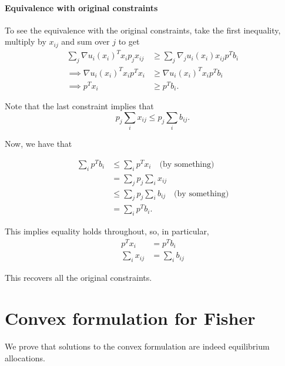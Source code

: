 \documentclass[12pt]{article}
\begin{document}
\paragraph{Equivalence with original constraints}
To see the equivalence with the original constraints, take the first inequality,
multiply by $x_{ij}$ and sum over $j$ to get
\begin{align*}
\sum_j \nabla u_i(x_i)^T x_i p_j x_{ij} &\geq \sum_j \nabla_j u_i(x_i) x_{ij} p^T b_i \\
\implies \nabla u_i(x_i)^T x_i p^T x_i &\geq \nabla u_i(x_i)^T x_i p^T b_i \\
\implies p^T x_i &\geq p^T b_i.
\end{align*}

Note that the last constraint implies that
\[
p_j \sum_i x_{ij} \leq p_j \sum_i b_{ij}.
\]

Now, we have that

\begin{align*}
\sum_i p^T b_i &\leq \sum_i p^T x_i\quad \text{(by something)}\\
&= \sum_j p_j \sum_i x_{ij} \\
&\leq \sum_j p_j \sum_i b_{ij}\quad \text{(by something)}\\
&= \sum_i p^T b_i.
\end{align*}

This implies equality holds throughout, so, in particular,
\begin{align*}
p^T x_i &= p^T b_i\\
\sum_i x_{ij} &= \sum_i b_{ij}
\end{align*}

This recovers all the original constraints.

\section{Convex formulation for Fisher}
\label{sec:fisher_proof}
We prove that solutions to the convex formulation %
are indeed equilibrium allocations.


\newpage


\end{document}
